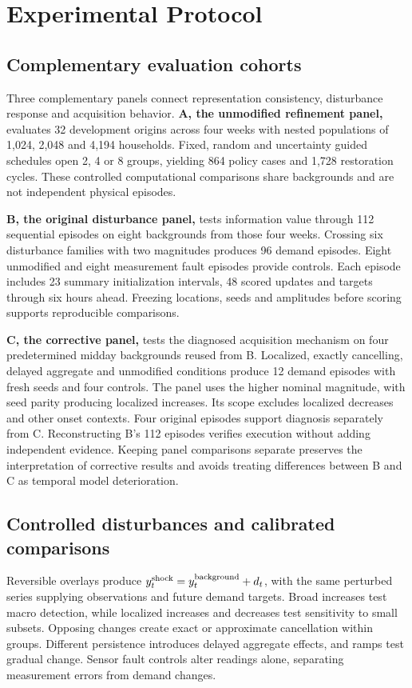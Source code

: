 \documentclass[conference]{IEEEtran}
\begin{document}
\section{Experimental Protocol}
\subsection{Complementary evaluation cohorts}
Three complementary panels connect representation consistency, disturbance response and acquisition behavior. \textbf{A, the unmodified refinement panel,} evaluates 32 development origins across four weeks with nested populations of 1,024, 2,048 and 4,194 households. Fixed, random and uncertainty guided schedules open 2, 4 or 8 groups, yielding 864 policy cases and 1,728 restoration cycles. These controlled computational comparisons share backgrounds and are not independent physical episodes.

\textbf{B, the original disturbance panel,} tests information value through 112 sequential episodes on eight backgrounds from those four weeks. Crossing six disturbance families with two magnitudes produces 96 demand episodes. Eight unmodified and eight measurement fault episodes provide controls. Each episode includes 23 summary initialization intervals, 48 scored updates and targets through six hours ahead. Freezing locations, seeds and amplitudes before scoring supports reproducible comparisons.

\textbf{C, the corrective panel,} tests the diagnosed acquisition mechanism on four predetermined midday backgrounds reused from B. Localized, exactly cancelling, delayed aggregate and unmodified conditions produce 12 demand episodes with fresh seeds and four controls. The panel uses the higher nominal magnitude, with seed parity producing localized increases. Its scope excludes localized decreases and other onset contexts. Four original episodes support diagnosis separately from C. Reconstructing B's 112 episodes verifies execution without adding independent evidence. Keeping panel comparisons separate preserves the interpretation of corrective results and avoids treating differences between B and C as temporal model deterioration.




\subsection{Controlled disturbances and calibrated comparisons}
Reversible overlays produce $y^{\rm shock}_t=y^{\rm background}_t+d_t$, with the same perturbed series supplying observations and future demand targets. Broad increases test macro detection, while localized increases and decreases test sensitivity to small subsets. Opposing changes create exact or approximate cancellation within groups. Different persistence introduces delayed aggregate effects, and ramps test gradual change. Sensor fault controls alter readings alone, separating measurement errors from demand changes.
\end{document}
